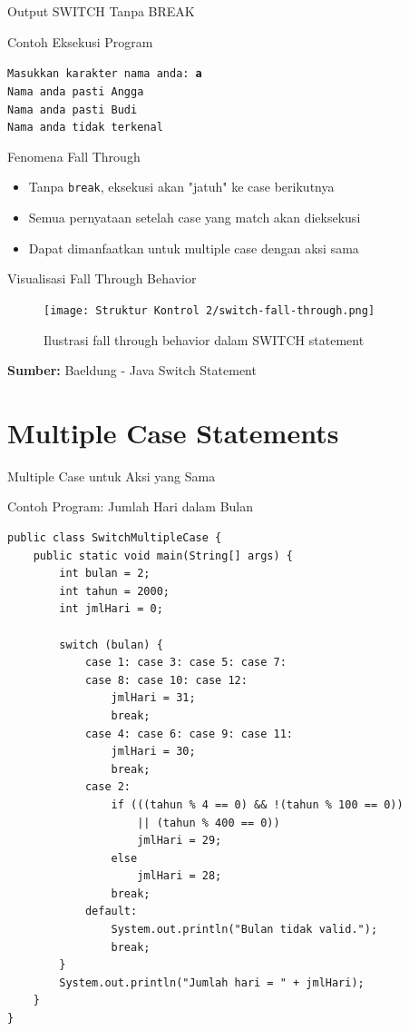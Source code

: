\documentclass{beamer}
\begin{document}
\begin{frame}{Output SWITCH Tanpa BREAK}
\begin{block}{Contoh Eksekusi Program}
\colorbox{gray!20}{
    \parbox{0.9\textwidth}{
        \texttt{Masukkan karakter nama anda: \textbf{a}\\
        Nama anda pasti Angga\\
        Nama anda pasti Budi\\
        Nama anda tidak terkenal}
    }
}
\end{block}

\begin{block}{Fenomena Fall Through}
\begin{itemize}
\item Tanpa \texttt{break}, eksekusi akan "jatuh" ke case berikutnya
\item Semua pernyataan setelah case yang match akan dieksekusi
\item Dapat dimanfaatkan untuk multiple case dengan aksi sama
\end{itemize}
\end{block}
\end{frame}

\begin{frame}[fragile]{Visualisasi Fall Through Behavior}
  \begin{figure}[h]
    \centering
    \texttt{[image: Struktur Kontrol 2/switch-fall-through.png]}
    \caption{Ilustrasi fall through behavior dalam SWITCH statement}
    \label{fig:switch-fall-through}
  \end{figure}
  \textbf{Sumber: }Baeldung - Java Switch Statement
\end{frame}

\section{Multiple Case Statements}
\begin{frame}[fragile]{Multiple Case untuk Aksi yang Sama}
  \begin{exampleblock}{Contoh Program: Jumlah Hari dalam Bulan}
    \begin{lstlisting}
public class SwitchMultipleCase {
    public static void main(String[] args) {
        int bulan = 2;
        int tahun = 2000;
        int jmlHari = 0;

        switch (bulan) {
            case 1: case 3: case 5: case 7: 
            case 8: case 10: case 12:
                jmlHari = 31;
                break;
            case 4: case 6: case 9: case 11:
                jmlHari = 30;
                break;
            case 2:
                if (((tahun % 4 == 0) && !(tahun % 100 == 0)) 
                    || (tahun % 400 == 0))
                    jmlHari = 29;
                else
                    jmlHari = 28;
                break;
            default:
                System.out.println("Bulan tidak valid.");
                break;
        }
        System.out.println("Jumlah hari = " + jmlHari);
    }
}
    \end{lstlisting}
  \end{exampleblock}
\end{frame}
\end{document}
